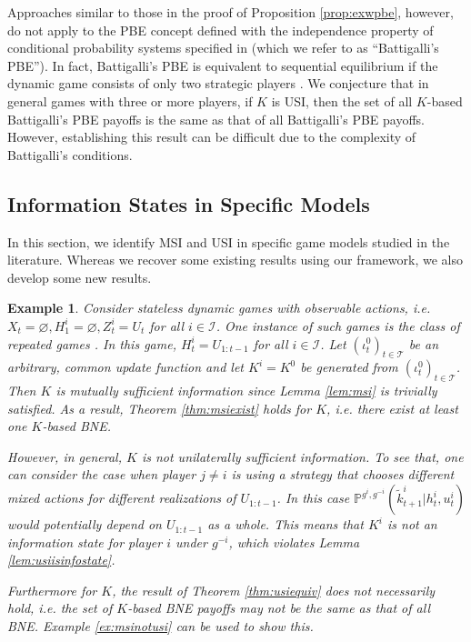 \documentclass[pdflatex,sn-basic]{sn-jnl}
\renewcommand{\Pr}{\mathbb{P}}
\newcommand{\Comp}{K}
\newcommand{\comp}{k}
\theoremstyle{thmstyleone}%
\theoremstyle{thmstyletwo}%
\theoremstyle{thmstylethree}%
\newtheorem{example}{Example}
\begin{document}
Approaches similar to those in the proof of Proposition \ref{prop:exwpbe}, however, do not apply to the PBE concept defined with the independence property of conditional probability systems specified in \cite{battigalli1996strategic} (which we refer to as ``Battigalli's PBE''). In fact, Battigalli's PBE is equivalent to sequential equilibrium if the dynamic game consists of only two strategic players \citep{battigalli1996strategic}. We conjecture that in general games with three or more players, if $\Comp$ is USI, then the set of all $\Comp$-based Battigalli's PBE payoffs is the same as that of all Battigalli's PBE payoffs. However, establishing this result can be difficult due to the complexity of Battigalli's conditions. 

\subsection{Information States in Specific Models}
In this section, we identify MSI and USI in specific game models studied in the literature. Whereas we recover some existing results using our framework, we also develop some new results.

\begin{example}\label{ex:repeatedgames}
	Consider stateless dynamic games with observable actions, i.e. $X_t=\varnothing, H_1^i=\varnothing, Z_t^i=U_t$ for all $i\in\mathcal{I}$. One instance of such games is the class of repeated games \citep{fudenberg1991game}. In this game, $H_t^i=U_{1:t-1}$ for all $i\in\mathcal{I}$. Let $(\iota_t^0)_{t\in\mathcal{T}}$ be an arbitrary, common update function and let $\Comp^i=\Comp^0$ be generated from $(\iota_t^0)_{t\in\mathcal{T}}$. Then $\Comp$ is mutually sufficient information since Lemma \ref{lem:msi} is trivially satisfied. As a result, Theorem \ref{thm:msiexist} holds for $\Comp$, i.e. there exist at least one $\Comp$-based BNE.
	
	However, in general, $\Comp$ is not unilaterally sufficient information. To see that, one can consider the case when player $j\neq i$ is using a strategy that chooses different mixed actions for different realizations of $U_{1:t-1}$. In this case $\Pr^{g^i, g^{-i}}(\tilde{\comp}_{t+1}^i|h_t^i, u_t^i)$ would potentially depend on $U_{1:t-1}$ as a whole. This means that $\Comp^i$ is not an information state for player $i$ under $g^{-i}$, which violates Lemma \ref{lem:usiisinfostate}.
	
	Furthermore for $\Comp$, the result of Theorem \ref{thm:usiequiv} does not necessarily hold, i.e. the set of $\Comp$-based BNE payoffs may not be the same as that of all BNE. Example \ref{ex:msinotusi} can be used to show this.
	
\end{example}
\end{document}
